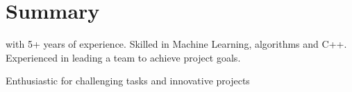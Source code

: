 \section{Summary}
\summaryPosition\space with 5+ years of experience. Skilled in Machine Learning, algorithms and C++. Experienced in leading a team to achieve project goals.

Enthusiastic for challenging tasks and innovative projects %
